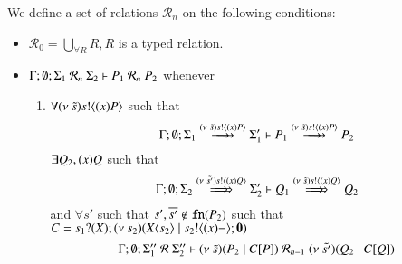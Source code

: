 \begin{definition}\rm
	We define a set of relations $\mathcal{R}_n$
	on the following conditions:
%
	\begin{itemize}
		\item	$\mathcal{R}_0 = \bigcup_{\forall R} R, R$ is a typed relation.
		\item	$\Gamma; \emptyset; \Sigma_1\ \mathcal{R}_n\ \Sigma_2 \vdash P_1\ \mathcal{R}_n\ P_2$
			whenever
			\begin{enumerate}
				\item	$\forall (\nu\ \tilde{s}) s ! \langle (x)P \rangle$ such that
					\[
						\Gamma; \emptyset; \Sigma_1 \hby{\news{\tilde{s}} \bactout{s}{\abs{x} P}} \Sigma_1' \proves P_1 \hby{\news{\tilde{s}} \bactout{s}{\abs{x} P}} P_2
					\]
					$\exists Q_2, (x)Q$ such that
					\[
						\Gamma; \emptyset; \Sigma_2 \Hby{\news{\tilde{s'}} \bactout{s}{\abs{x} Q}} \Sigma_2' \proves Q_1 \Hby{\news{\tilde{s}} \bactout{s}{\abs{x} Q}} Q_2
					\]
					and $\forall s'$ such that $s', \overline{s'} \notin \mathtt{fn}(P_2)$ such that $C = s_1 ? (X) ; (\nu\ s_2)(X\langle s_2 \rangle \;|\; s_2 ! \langle (x)- \rangle ; \mathbf{0})$
					\[
						\Gamma; \emptyset; \Sigma_1''\ \mathcal{R}\ \Sigma_2'' \proves
						\newsp{\tilde{s}}{P_2 \Par \context{C}{P}} %
						\ \mathcal{R}_{n-1}\ 
						\newsp{\tilde{s'}}{Q_2 \Par \context{C}{Q}}%
					\]




\end{enumerate}
\end{itemize}
\end{definition}
